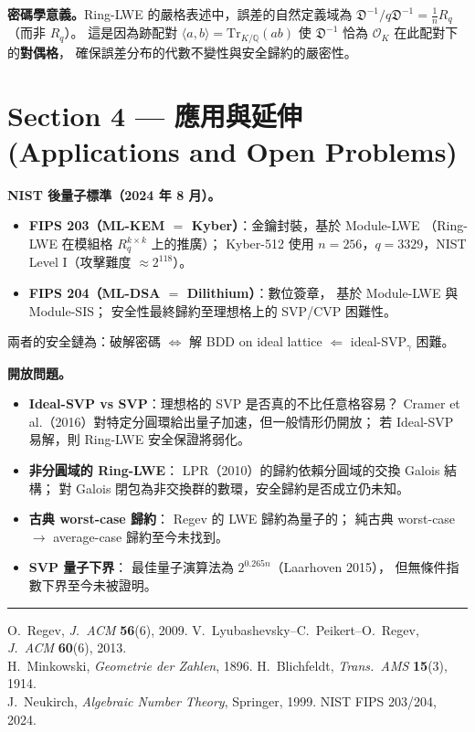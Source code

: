 \documentclass[10.5pt, a4paper]{article}
\theoremstyle{cpt}
\begin{document}
\textbf{密碼學意義。}Ring-LWE 的嚴格表述中，誤差的自然定義域為
$\mathfrak{D}^{-1}/q\mathfrak{D}^{-1}=\frac{1}{n}R_q$（而非 $R_q$）。
這是因為跡配對 $\langle a,b\rangle=\mathrm{Tr}_{K/\mathbb{Q}}(ab)$ 使
$\mathfrak{D}^{-1}$ 恰為 $\mathcal{O}_K$ 在此配對下的\textbf{對偶格}，
確保誤差分布的代數不變性與安全歸約的嚴密性。

\section{Section 4 \;—\; 應用與延伸
  \textnormal{\small\color{gray}(Applications and Open Problems)}}

\textbf{NIST 後量子標準（2024 年 8 月）。}
\begin{itemize}
  \item \textbf{FIPS 203（ML-KEM $=$ Kyber）}：金鑰封裝，基於 Module-LWE
    （Ring-LWE 在模組格 $R_q^{k\times k}$ 上的推廣）；
    Kyber-512 使用 $n=256$，$q=3329$，NIST Level I（攻擊難度 $\approx 2^{118}$）。
  \item \textbf{FIPS 204（ML-DSA $=$ Dilithium）}：數位簽章，
    基於 Module-LWE 與 Module-SIS；
    安全性最終歸約至理想格上的 SVP/CVP 困難性。
\end{itemize}
兩者的安全鏈為：破解密碼 $\Leftrightarrow$ 解 BDD on ideal lattice $\Leftarrow$ ideal-SVP$_\gamma$ 困難。

\textbf{開放問題。}
\begin{itemize}
  \item \textbf{Ideal-SVP vs SVP}：理想格的 SVP 是否真的不比任意格容易？
    Cramer et al.（2016）對特定分圓環給出量子加速，但一般情形仍開放；
    若 Ideal-SVP 易解，則 Ring-LWE 安全保證將弱化。
  \item \textbf{非分圓域的 Ring-LWE}：
    LPR（2010）的歸約依賴分圓域的交換 Galois 結構；
    對 Galois 閉包為非交換群的數環，安全歸約是否成立仍未知。
  \item \textbf{古典 worst-case 歸約}：
    Regev 的 LWE 歸約為量子的；
    純古典 worst-case $\to$ average-case 歸約至今未找到。
  \item \textbf{SVP 量子下界}：
    最佳量子演算法為 $2^{0.265n}$（Laarhoven 2015），
    但無條件指數下界至今未被證明。
\end{itemize}

\vspace{4pt}
\noindent\rule{\linewidth}{0.4pt}
\begin{center}\small\color{gray}
  O.\ Regev, \textit{J.\ ACM} \textbf{56}(6), 2009.\;
  V.\ Lyubashevsky--C.\ Peikert--O.\ Regev, \textit{J.\ ACM} \textbf{60}(6), 2013.\\[1pt]
  H.\ Minkowski, \textit{Geometrie der Zahlen}, 1896.\;
  H.\ Blichfeldt, \textit{Trans.\ AMS} \textbf{15}(3), 1914.\\[1pt]
  J.\ Neukirch, \textit{Algebraic Number Theory}, Springer, 1999.\;
  NIST FIPS 203/204, 2024.
\end{center}
\end{document}
